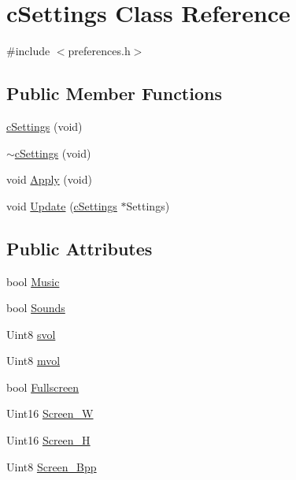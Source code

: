 \hypertarget{classc_settings}{\section{c\-Settings Class Reference}
\label{classc_settings}
}


{\ttfamily \#include $<$preferences.\-h$>$}

\subsection*{Public Member Functions}
\begin{DoxyCompactItemize}
\item 
\hyperlink{classc_settings_af09028118b43301676d2a0d37d78f210}{c\-Settings} (void)
\item 
\hyperlink{classc_settings_a1553b89230cefc43ae9cd691c1e213de}{$\sim$c\-Settings} (void)
\item 
void \hyperlink{classc_settings_ab5a83be74d8476af0fd7eac14fdaa7e9}{Apply} (void)
\item 
void \hyperlink{classc_settings_a673f47a8a7dc98fd4cf6b83961f7cdd8}{Update} (\hyperlink{classc_settings}{c\-Settings} $\ast$Settings)
\end{DoxyCompactItemize}
\subsection*{Public Attributes}
\begin{DoxyCompactItemize}
\item 
bool \hyperlink{classc_settings_ad470ee28a06fd0210eeb61d900047a49}{Music}
\item 
bool \hyperlink{classc_settings_a346a004a29a60f63b4a355209ff1258a}{Sounds}
\item 
Uint8 \hyperlink{classc_settings_a21e639229b63224feb0d5a1667263f22}{svol}
\item 
Uint8 \hyperlink{classc_settings_a0318e44a2bb567925fece56c93a4f1d8}{mvol}
\item 
bool \hyperlink{classc_settings_ae26d71cad2fd4042e17056f3c56cfcfc}{Fullscreen}
\item 
Uint16 \hyperlink{classc_settings_a3c3f9e8a8747fbf6cbdfd8ba1c3d76a9}{Screen\-\_\-\-W}
\item 
Uint16 \hyperlink{classc_settings_a0b956ad1e4ee40b78a8deb80fad448b9}{Screen\-\_\-\-H}
\item 
Uint8 \hyperlink{classc_settings_a13fd498f662fb549818da0b1ecd0a040}{Screen\-\_\-\-Bpp}
\end{DoxyCompactItemize}


